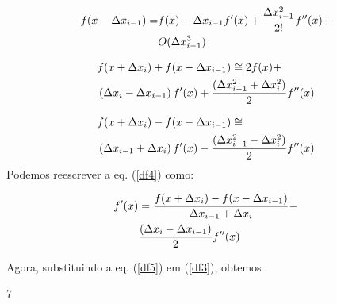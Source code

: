 \documentclass[10pt,a4paper,twocolumn,showkeys,showpacs,aps,groupedaddress,noeprint]{revtex4-1}
\begin{document}
\begin{align}
f(x-\Delta x_{i-1}) = & f(x)-\Delta x_{i-1}f^{\prime }(x)+
\dfrac{\Delta x_{i-1}^{2}}{2!}f^{\prime \prime }(x) + \notag \\ 
& O(\Delta x_{i-1}^{3})  \label{df2}
\end{align}

\begin{align}
  & f(x+\Delta x_{i}) +f(x-\Delta x_{i-1}) \cong  2f(x) + \notag \\ 
  &\left( \Delta x_{i}-\Delta x_{i-1}\right) f^{\prime }(x) +
 \dfrac{(\Delta x_{i-1}^{2}+\Delta x_{i}^{2})}{2}f^{\prime \prime }(x)  
 \label{df3}
\end{align}

\begin{align}
  & f(x+\Delta x_{i}) - f(x-\Delta x_{i-1})  \cong  \notag \\ 
  & \left( \Delta x_{i-1} + \Delta x_{i} \right) f^{\prime }(x) -
 \dfrac{(\Delta x_{i-1}^{2}-\Delta x_{i}^{2})}{2} f^{\prime \prime }(x) \label{df4}
\end{align}
Podemos reescrever a eq. (\ref{df4}) como:

\begin{align}
f^{\prime }(x) & = \dfrac{f(x+\Delta x_{i})-f(x-\Delta x_{i-1})}{\Delta
x_{i-1}+\Delta x_{i}} - \notag \\ 
 & \dfrac{(\Delta x_{i}-\Delta x_{i-1})}{2}f^{\prime \prime }(x)  \label{df5}
\end{align}

Agora, substituindo a eq. (\ref{df5}) em (\ref{df3}), obtemos


\nocite{Franco2006,Heath1997,Davies-SciAm2006,Castro2001,Bolivar2001}

\nocite{AdvBashScr,BGB2008,Robbins2005,Neves2008,Jargas2008-Shell}

% 
%
% 
% 
% 
% 
%
% 
% 
% 
 
% 

7
\end{document}
